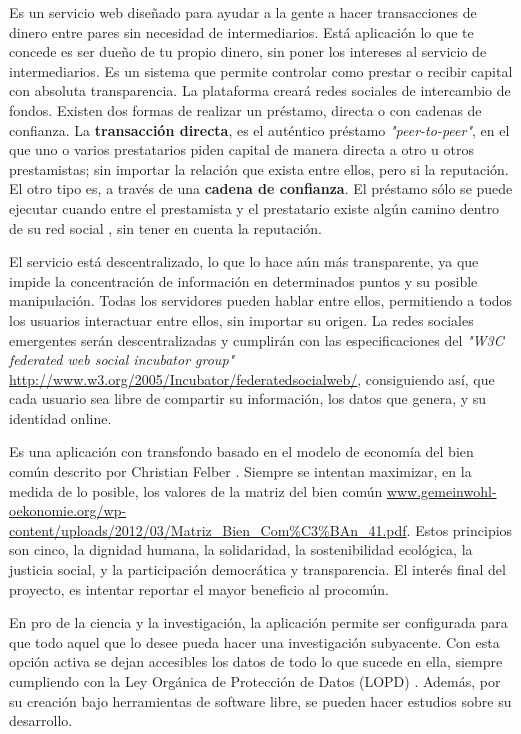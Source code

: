 \documentclass[a4paper, 12pt]{book}
\begin{document}
Es un servicio web diseñado para ayudar a la gente a hacer transacciones de 
dinero entre pares sin necesidad de intermediarios. Está aplicación lo que te 
concede es ser dueño de tu propio dinero, sin poner los intereses al servicio 
de intermediarios. Es un sistema que permite controlar como prestar o recibir 
capital con absoluta transparencia. La plataforma creará redes sociales de 
intercambio de fondos. Existen dos formas de realizar un préstamo, directa o 
con cadenas de confianza. La \textbf{transacción directa}, es el auténtico 
préstamo \textit{"peer-to-peer"}, en el que uno o varios prestatarios piden 
capital de manera directa a otro u otros prestamistas; sin importar la relación 
que exista entre ellos, pero si la reputación. El otro tipo es, a través de una 
\textbf{cadena de confianza}. El préstamo sólo se puede ejecutar cuando entre 
el prestamista y el prestatario existe algún camino dentro de su red social 
\cite{ripple}, sin tener en cuenta la reputación.

El servicio está descentralizado, lo que lo hace aún más transparente, ya que 
impide la concentración de información en determinados puntos y su posible 
manipulación. Todas los servidores pueden hablar entre ellos, permitiendo a 
todos los usuarios interactuar entre ellos, sin importar su origen. La redes 
sociales emergentes serán descentralizadas y cumplirán con las especificaciones 
del \textit{"W3C federated web social incubator group"} 
\url{http://www.w3.org/2005/Incubator/federatedsocialweb/}, consiguiendo así, 
que cada usuario sea libre de compartir su información, los datos que genera, 
y su identidad online.

Es una aplicación con transfondo basado en el modelo de economía del bien común 
descrito por Christian Felber \cite{Christian Felber}. Siempre se intentan 
maximizar, en la medida de lo posible, los valores de la matriz del bien común 
\url{www.gemeinwohl-oekonomie.org/wp-content/uploads/2012/03/Matriz\_Bien\_Com\%C3\%BAn\_41.pdf}. 
Estos principios son cinco, la dignidad humana, la solidaridad, 
la sostenibilidad ecológica, la justicia social, y la participación democrática 
y transparencia. El interés final del proyecto, es intentar reportar el mayor 
beneficio al procomún.

En pro de la ciencia y la investigación, la aplicación permite ser configurada 
para que todo aquel que lo desee pueda hacer una investigación subyacente. 
Con esta opción activa se dejan accesibles los datos de todo lo que sucede en 
ella, siempre cumpliendo con la Ley Orgánica de Protección de Datos (LOPD) 
\cite{LOPD}. Además, por su creación bajo herramientas de software libre, 
se pueden hacer estudios sobre su desarrollo.
\end{document}
